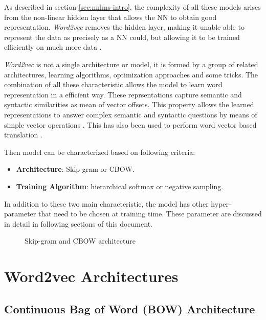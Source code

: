 As  described in section \ref{sec:nnlms-intro}, the complexity of all 
these models arises from the non-linear hidden layer that allows the \ac{NN} to
obtain good representation.  \textit{Word2vec} removes the hidden layer, making
it unable able to represent the data as precisely as a \ac{NN} could, but
allowing it to be trained efficiently on much
more data  \cite{DBLP:journals/corr/abs-1301-3781}.

\textit{Word2vec} is not a single architecture or model, it is formed by a
group of related architectures, learning algorithms, optimization 
approaches and some tricks. The combination of all these characteristic
allows the model  to learn word representation in a efficient
way. These reprsentations  capture semantic and syntactic
similarities as mean of vector offsets. This property allows the learned
representations to answer complex semantic and syntactic questions by means
of simple vector operations   \cite{MikolovSCCD13}. This has also
been used to perform word vector based translation \cite{DBLP:journals/corr/MikolovLS13}.  

Then model can be characterized based on following criteria:


\begin{itemize}
\item \textbf{Architecture}: Skip-gram or \ac{CBOW}.
\item \textbf{Training Algorithm}: hierarchical softmax  or negative sampling.
\end{itemize}

In addition to these two main characteristic, the model has other
hyper-parameter that need to be chosen at training time. These parameter are
discussed in detail in following sections of this document.




\begin{figure}[h]
    \centering
    \caption{Skip-gram and \ac{CBOW} architecture}
    \label{fig:skgram-cbow-architecture}
\end{figure}

\section{Word2vec Architectures}
\label{sec:word2v-architectures}


\subsection{Continuous Bag of Word (BOW) Architecture}

